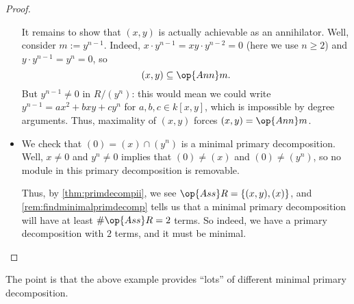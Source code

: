\begin{proof}
\begin{itemize}
		It remains to show that $(x,y)$ is actually achievable as an annihilator. Well, consider $m:=y^{n-1}$. Indeed, $x\cdot y^{n-1}=xy\cdot y^{n-2}=0$ (here we use $n\ge2$) and $y\cdot y^{n-1}= y^n=0$, so
		\[(x,y)\subseteq\op{Ann}m.\]
		But $y^{n-1}\ne0$ in $R/\left(y^n\right)$: this would mean we could write $y^{n-1}=ax^2+bxy+cy^n$ for $a,b,c\in k[x,y]$, which is impossible by degree arguments. Thus, maximality of $(x,y)$ forces $(x,y)=\op{Ann}m$.

		\item We check that $(0)=(x)\cap\left(y^n\right)$ is a minimal primary decomposition. Well, $x\ne0$ and $y^n\ne0$ implies that $(0)\ne(x)$ and $(0)\ne\left(y^n\right)$, so no module in this primary decomposition is removable.
		
		Thus, by \autoref{thm:primdecompii}, we see $\op{Ass}R=\{(x,y),(x)\}$, and \autoref{rem:findminimalprimdecomp} tells us that a minimal primary decomposition will have at least $\#\op{Ass}R=2$ terms. So indeed, we have a primary decomposition with $2$ terms, and it must be minimal.
		\qedhere
	\end{itemize}
\end{proof}
The point is that the above example provides ``lots'' of different minimal primary decomposition.

